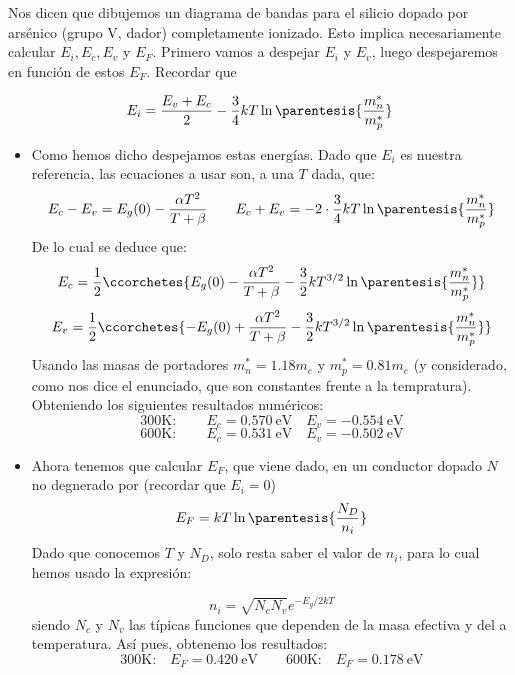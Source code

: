 
	Nos dicen que dibujemos un diagrama de bandas para el silicio dopado por arsénico (grupo V, dador) completamente ionizado. Esto implica necesariamente calcular $E_i,E_c,E_v$ y $E_F$. Primero vamos a despejar $E_i$ y $E_v$, luego despejaremos en función de estos $E_F$. Recordar que

	\begin{equation}
		E_i = \frac{E_v+E_c}{2} - \frac{3}{4} kT \ln\parentesis{\frac{m_n^*}{m_p^*}}
	\end{equation}

	\begin{itemize}
		\item Como hemos dicho despejamos estas energías. Dado que $E_i$ es nuestra referencia, las ecuaciones a usar son, a una $T$ dada, que:
		      \begin{equation}
			      E_c-E_v = E_g(0) - \frac{\alpha T^2}{T+\beta} \qquad E_c+E_v=-2 \cdot \frac{3}{4} kT\ln \parentesis{\frac{m_n^*}{m_p^*}}
		      \end{equation}
		      De lo cual se deduce que:
		      \begin{equation}
			      E_c = \frac{1}{2} \ccorchetes{E_g(0) - \frac{\alpha T^2}{T+\beta} - \frac{3}{2} kT^{3/2} \ln \parentesis{\frac{m_n^*}{m_p^*}}}
		      \end{equation}
		      \begin{equation}
			      E_v = \frac{1}{2} \ccorchetes{-E_g(0) +\frac{\alpha T^2}{T+\beta} - \frac{3}{2} kT^{3/2} \ln \parentesis{\frac{m_n^*}{m_p^*}}}
		      \end{equation}
		      Usando las masas de portadores $m_n^*=1.18m_e$ y $m_p^*=0.81m_e$  (y considerado, como nos dice el enunciado, que son constantes frente a la tempratura). Obteniendo los siguientes resultados numéricos:
		      \begin{equation}
			      \text{300K}: \qquad
			      E_c = 0.570 \ \text{eV} \quad E_v = -0.554 \ \text{eV}
		      \end{equation}
		      \begin{equation}
			      \text{600K}: \qquad
			      E_c = 0.531  \ \text{eV} \quad E_v = -0.502\ \text{eV}
		      \end{equation}
		\item Ahora tenemos que calcular $E_F$, que viene dado, en un conductor dopado $N$ no degnerado por (recordar que $E_i=0$)
		      \begin{equation}
			      E_F = kT \ln \parentesis{\frac{N_D}{n_i}}
		      \end{equation}
		      Dado que conocemos $T$ y $N_D$, solo resta saber el valor de $n_i$, para lo cual hemos usado la expresión:

		      \begin{equation}
			      n_i = \sqrt{N_c N_v} e^{-E_g/2kT}
		      \end{equation}
		      siendo $N_c$ y $N_v$ las típicas funciones que dependen de la masa efectiva y del a temperatura. Así pues, obtenemo los resultados:
		      \begin{equation}
			      \text{300K:}\quad
			      E_F = 0.420 \ \text{eV} \qquad
			      \text{600K:}\quad
			      E_F= 0.178 \ \text{eV}
		      \end{equation}
	\end{itemize}
